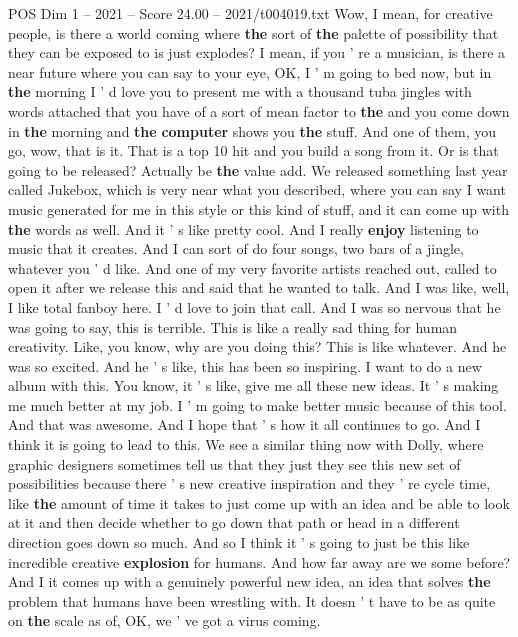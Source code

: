 \begin{textsample}{POS Dim 1 – 2021 – Score 24.00 – 2021/t004019.txt}
Wow, I mean, for creative people, is there a world coming where \textbf{the} sort of \textbf{the} palette of possibility that they can be exposed to is just explodes?
I mean, if you ' re a musician, is there a near future where you can say to your eye, OK, I ' m going to bed now, but in \textbf{the} morning I ' d love you to present me with a thousand tuba jingles with words attached that you have of a sort of mean factor to \textbf{the} and you come down in \textbf{the} morning and \textbf{the} \textbf{computer} shows you \textbf{the} stuff.
And one of them, you go, wow, that is it.
That is a top 10 hit and you build a song from it.
Or is that going to be released?
Actually be \textbf{the} value add.
We released something last year called Jukebox, which is very near what you described, where you can say I want music generated for me in this style or this kind of stuff, and it can come up with \textbf{the} words as well.
And it ' s like pretty cool.
And I really \textbf{enjoy} listening to music that it creates.
And I can sort of do four songs, two bars of a jingle, whatever you ' d like.
And one of my very favorite artists reached out, called to open it after we release this and said that he wanted to talk.
And I was like, well, I like total fanboy here.
I ' d love to join that call.
And I was so nervous that he was going to say, this is terrible.
This is like a really sad thing for human creativity.
Like, you know, why are you doing this?
This is like whatever.
And he was so excited.
And he ' s like, this has been so inspiring.
I want to do a new album with this.
You know, it ' s like, give me all these new ideas.
It ' s making me much better at my job.
I ' m going to make better music because of this tool.
And that was awesome.
And I hope that ' s how it all continues to go.
And I think it is going to lead to this.
We see a similar thing now with Dolly, where graphic designers sometimes tell us that they just they see this new set of possibilities because there ' s new creative inspiration and they ' re cycle time, like \textbf{the} amount of time it takes to just come up with an idea and be able to look at it and then decide whether to go down that path or head in a different direction goes down so much.
And so I think it ' s going to just be this like incredible creative \textbf{explosion} for humans.
And how far away are we some before?
And I it comes up with a genuinely powerful new idea, an idea that solves \textbf{the} problem that humans have been wrestling with.
It doesn ' t have to be as quite on \textbf{the} scale as of, OK, we ' ve got a virus coming.

\end{textsample}
